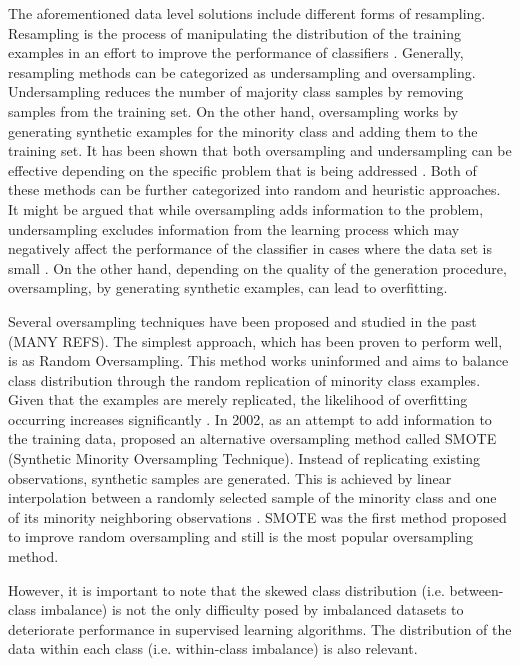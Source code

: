 \documentclass[parskip=full]{scrartcl}
\begin{document}
The aforementioned data level solutions include different forms of resampling.
Resampling is the process of manipulating the distribution of the training
examples in an effort to improve the performance of classifiers \cite{Jo2004}.
Generally, resampling methods can be categorized as undersampling and
oversampling. Undersampling reduces the number of majority class samples by
removing samples from the training set. On the other hand, oversampling works by
generating synthetic examples for the minority class and adding them to the
training set. It has been shown that both oversampling and undersampling can be
effective depending on the specific problem that is being addressed
\cite{Chawla2002}. Both of these methods can be further categorized into random
and heuristic approaches. It might be argued that while oversampling adds
information to the problem, undersampling excludes information from the learning
process which may negatively affect the performance of the classifier in cases
where the data set is small \cite{He2008}. On the other hand, depending on the
quality of the generation procedure, oversampling, by generating synthetic
examples, can lead to overfitting.

Several oversampling techniques have been proposed and studied in the past (MANY
REFS). The simplest approach, which has been proven to perform well, is as
Random Oversampling. This method works uninformed and aims to balance class
distribution through the random replication of minority class examples. Given
that the examples are merely replicated, the likelihood of overfitting occurring
increases significantly \cite{Batista2004}. In 2002, as an attempt to add
information to the training data, \cite{Chawla2002} proposed an alternative
oversampling method called SMOTE (Synthetic Minority Oversampling Technique).
Instead of replicating existing observations, synthetic samples are generated.
This is achieved by linear interpolation between a randomly selected sample of
the minority class and one of its minority neighboring observations
\cite{Douzas2018} \cite{Fernandez2018} \cite{Liu2007}. SMOTE was the first
method proposed to improve random oversampling and still is the most popular
oversampling method.

However, it is important to note that the skewed class distribution (i.e.
between-class imbalance) is not the only difficulty posed by imbalanced datasets
to deteriorate performance in supervised learning algorithms. The distribution
of the data within each class (i.e. within-class imbalance) is also relevant.
\end{document}
